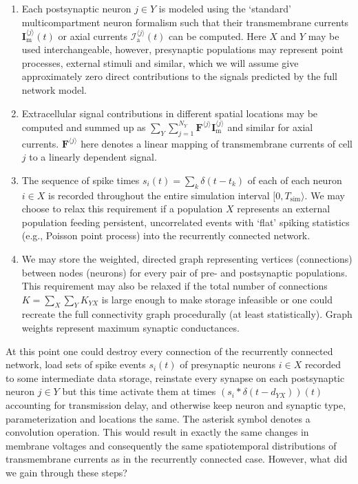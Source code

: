 \begin{enumerate}
\item Each postsynaptic neuron $j \in Y$ is modeled using the  `standard' multicompartment neuron formalism such that their transmembrane currents $\mathbf{I}_\mathrm{m}^{\langle j \rangle}(t)$ or axial currents $\mathcal{I}_\mathrm{a}^{\langle j \rangle}(t)$ can be computed. 
Here $X$ and $Y$ may be used interchangeable, however, 
presynaptic populations may represent point processes, external stimuli and similar, which we will assume give approximately zero direct contributions to the signals predicted by the full network model.
\item Extracellular signal contributions in different spatial locations may be computed and summed up as 
$\sum_Y \sum_{j=1}^{N_Y} \mathbf{F}^{\langle j \rangle} \mathbf{I}_\mathrm{m}^{\langle j \rangle}$ and similar for axial currents. 
$\mathbf{F}^{\langle j \rangle}$ here denotes a linear mapping of transmembrane currents of cell $j$ to a linearly dependent signal.  
\item The sequence of spike times $s_i(t) = \sum_k \delta (t - t_k)$  of each of each neuron $i \in X$ is recorded throughout the entire simulation interval $[0, T_\mathrm{sim} \rangle$. 
We may choose to relax this requirement if a population $X$ represents an external population feeding persistent, uncorrelated events with `flat' spiking statistics (e.g., Poisson point process) into the recurrently connected network. 
\item We may store the weighted, directed graph representing vertices (connections) between nodes (neurons) for every pair of pre- and postsynaptic populations. 
This requirement may also be relaxed if the total number of connections $K = \sum_X \sum_Y K_{YX}$ is large enough to make storage infeasible or one could recreate the full connectivity graph procedurally (at least statistically). 
Graph weights represent maximum synaptic conductances. 
\end{enumerate}

At this point one could destroy every connection of the recurrently connected network, 
load sets of spike events $s_i(t)$ of presynaptic neurons $i \in X$ recorded to some intermediate data storage, 
reinstate every synapse on each postsynaptic neuron $j \in Y$ but this time activate them at times $\left(s_i \ast \delta(t - d_{YX})\right)(t)$ accounting for transmission delay, 
and otherwise keep neuron and synaptic type, parameterization and locations the same. 
The asterisk symbol denotes a convolution operation. 
This would result in exactly the same changes in membrane voltages and consequently the same spatiotemporal distributions of transmembrane currents as in the recurrently connected case. 
However, what did we gain through these steps?

